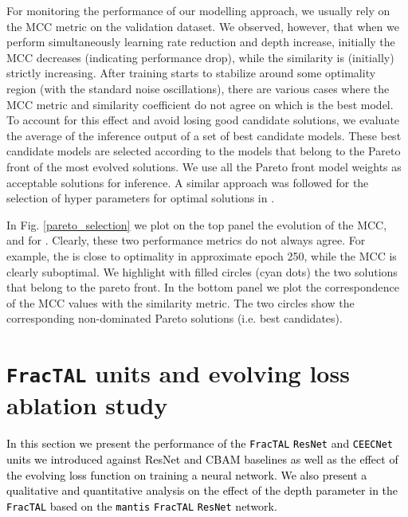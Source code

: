 \documentclass[times, 5p]{elsarticle}
\def \FracTAL {\texttt{FracTAL} }
\newcommand{\ceecnet}{\texttt{CEECNet}}
\newcommand{\mantis}{\texttt{mantis}}
\begin{document}
For monitoring the performance of our modelling approach, we usually rely on the MCC metric on the validation dataset. We observed, however, that when we perform simultaneously learning rate reduction and  depth increase, initially the MCC decreases (indicating performance drop), while the  similarity  is (initially) strictly increasing. After training starts to stabilize around some optimality region (with the standard noise oscillations), there are various cases where the MCC metric and  similarity coefficient do not agree on which is the best model. To account for this effect and avoid losing good candidate solutions, we evaluate the average of the inference output of a set of best candidate models. These best candidate models are selected according to the models that belong to the Pareto front of the most evolved solutions. We use all the Pareto front \citep{10.1007/s11047-018-9685-y} model weights as acceptable solutions for inference. A similar approach was followed for the selection of hyper parameters for optimal solutions in \cite{WALDNER2020111741}. 


In Fig. \ref{pareto_selection} we plot on the top panel the evolution of the MCC, and  for . Clearly, these two performance metrics do not always agree. For example, the  is close to optimality in approximate epoch 250, while the MCC is clearly suboptimal. We highlight with filled circles (cyan dots) the two solutions that belong to the pareto front. In the bottom panel we plot the correspondence of the MCC values with the  similarity metric. The two circles show the corresponding non-dominated Pareto solutions (i.e. best candidates).  





\section{\FracTAL units and evolving loss ablation study}
\label{section_ablation_study}




\textcolor{black}{
In this section    we present the performance of the \FracTAL{} \texttt{ResNet} \citep{DBLP:journals/corr/HeZRS15,DBLP:journals/corr/HeZR016} and \ceecnet{} units we introduced against ResNet and CBAM \citep{10.1007/978-3-030-01234-2_1} baselines as well as  
 the effect of the evolving  loss function on training a neural network. We also present a qualitative and quantitative analysis on the effect of the depth parameter in the \FracTAL based on the \mantis{} \FracTAL \texttt{ResNet} network.}   
\end{document}
